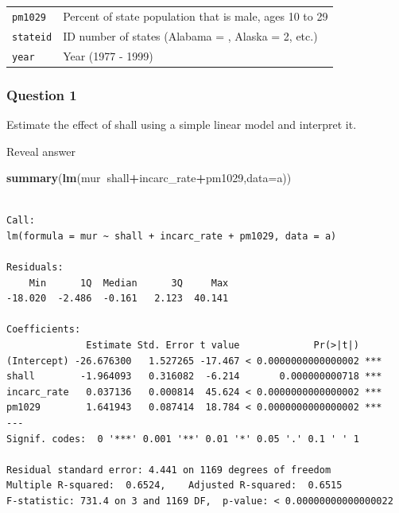 \documentclass[]{article}
\newenvironment{Shaded}{\begin{snugshade}}{\end{snugshade}}
\newcommand{\KeywordTok}[1]{\textcolor[rgb]{0.13,0.29,0.53}{\textbf{#1}}}
\newcommand{\DataTypeTok}[1]{\textcolor[rgb]{0.13,0.29,0.53}{#1}}
\newcommand{\OperatorTok}[1]{\textcolor[rgb]{0.81,0.36,0.00}{\textbf{#1}}}
\newcommand{\NormalTok}[1]{#1}
\theoremstyle{definition}
\theoremstyle{definition}
\theoremstyle{definition}
\theoremstyle{remark}
\begin{document}
\begin{longtable}[]{@{}ll@{}}
\begin{minipage}[t]{0.10\columnwidth}
\texttt{pm1029}\strut
\end{minipage} & \begin{minipage}[t]{0.84\columnwidth}\raggedright\strut
Percent of state population that is male, ages 10 to 29\strut
\end{minipage}\tabularnewline
\begin{minipage}[t]{0.10\columnwidth}\raggedright\strut
\texttt{stateid}\strut
\end{minipage} & \begin{minipage}[t]{0.84\columnwidth}\raggedright\strut
ID number of states (Alabama = , Alaska = 2, etc.)\strut
\end{minipage}\tabularnewline
\begin{minipage}[t]{0.10\columnwidth}\raggedright\strut
\texttt{year}\strut
\end{minipage} & \begin{minipage}[t]{0.84\columnwidth}\raggedright\strut
Year (1977 - 1999)\strut
\end{minipage}\tabularnewline
\bottomrule
\end{longtable}

\subsubsection{Question 1}\label{question-1-1}

Estimate the effect of shall using a simple linear model and interpret
it.

 Reveal answer

\begin{Shaded}
\begin{Highlighting}[]
\KeywordTok{summary}\NormalTok{(}\KeywordTok{lm}\NormalTok{(mur}\OperatorTok{~}\NormalTok{shall}\OperatorTok{+}\NormalTok{incarc_rate}\OperatorTok{+}\NormalTok{pm1029,}\DataTypeTok{data=}\NormalTok{a))}
\end{Highlighting}
\end{Shaded}

\begin{verbatim}

Call:
lm(formula = mur ~ shall + incarc_rate + pm1029, data = a)

Residuals:
    Min      1Q  Median      3Q     Max 
-18.020  -2.486  -0.161   2.123  40.141 

Coefficients:
              Estimate Std. Error t value             Pr(>|t|)    
(Intercept) -26.676300   1.527265 -17.467 < 0.0000000000000002 ***
shall        -1.964093   0.316082  -6.214       0.000000000718 ***
incarc_rate   0.037136   0.000814  45.624 < 0.0000000000000002 ***
pm1029        1.641943   0.087414  18.784 < 0.0000000000000002 ***
---
Signif. codes:  0 '***' 0.001 '**' 0.01 '*' 0.05 '.' 0.1 ' ' 1

Residual standard error: 4.441 on 1169 degrees of freedom
Multiple R-squared:  0.6524,    Adjusted R-squared:  0.6515 
F-statistic: 731.4 on 3 and 1169 DF,  p-value: < 0.00000000000000022
\end{verbatim}
\end{document}
